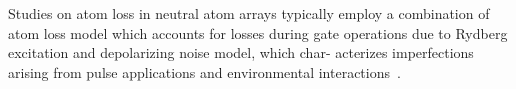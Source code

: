 \documentclass[aps,prb,twocolumn,superscriptaddress,nobibnotes]{revtex4-2} %
\begin{document}
Studies on atom loss in neutral atom arrays typically employ a combination of atom loss model which accounts for losses during gate operations due to Rydberg excitation and depolarizing noise model, which char-
acterizes imperfections arising from pulse applications and environmental interactions~\cite{Perrin_2025}.
\end{document}
